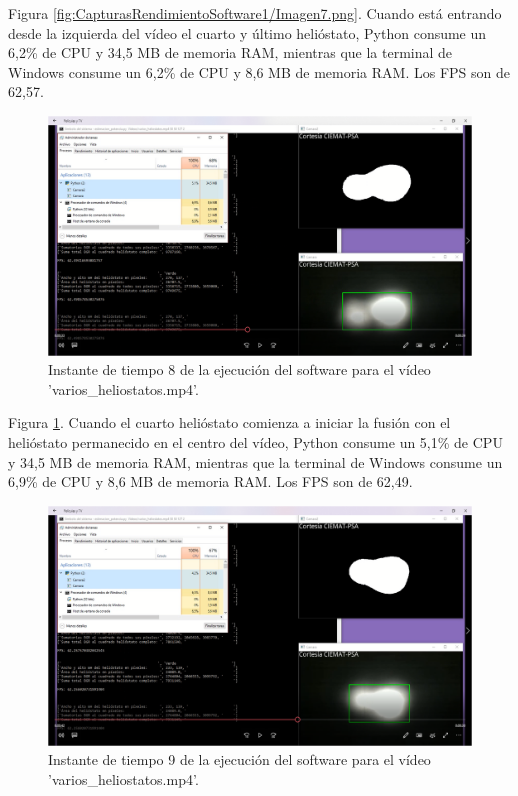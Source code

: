 Figura \ref{fig:CapturasRendimientoSoftware1/Imagen7.png}. Cuando está entrando desde la izquierda del vídeo el cuarto y último helióstato, Python consume un 6,2\% de CPU y 34,5 MB de memoria RAM, mientras que la terminal de Windows consume un 6,2\% de CPU y 8,6 MB de memoria RAM. Los FPS son de 62,57.\\[20pt]

\begin{figure}[h!]
  	\centering
	\includegraphics[width=\textwidth]{CapturasRendimientoSoftware1/Imagen8.png}
	\caption{Instante de tiempo 8 de la ejecución del software para el vídeo 'varios\_heliostatos.mp4'.
	\label{fig:CapturasRendimientoSoftware1/Imagen8.png}}
\end{figure}

Figura \ref{fig:CapturasRendimientoSoftware1/Imagen8.png}. Cuando el cuarto helióstato comienza a iniciar la fusión con el helióstato permanecido en el centro del vídeo, Python consume un 5,1\% de CPU y 34,5 MB de memoria RAM, mientras que la terminal de Windows consume un 6,9\% de CPU y 8,6 MB de memoria RAM. Los FPS son de 62,49.\\[20pt]

\begin{figure}[h!]
  	\centering
	\includegraphics[width=\textwidth]{CapturasRendimientoSoftware1/Imagen9.png}
	\caption{Instante de tiempo 9 de la ejecución del software para el vídeo 'varios\_heliostatos.mp4'.
	\label{fig:CapturasRendimientoSoftware1/Imagen9.png}}
\end{figure}


